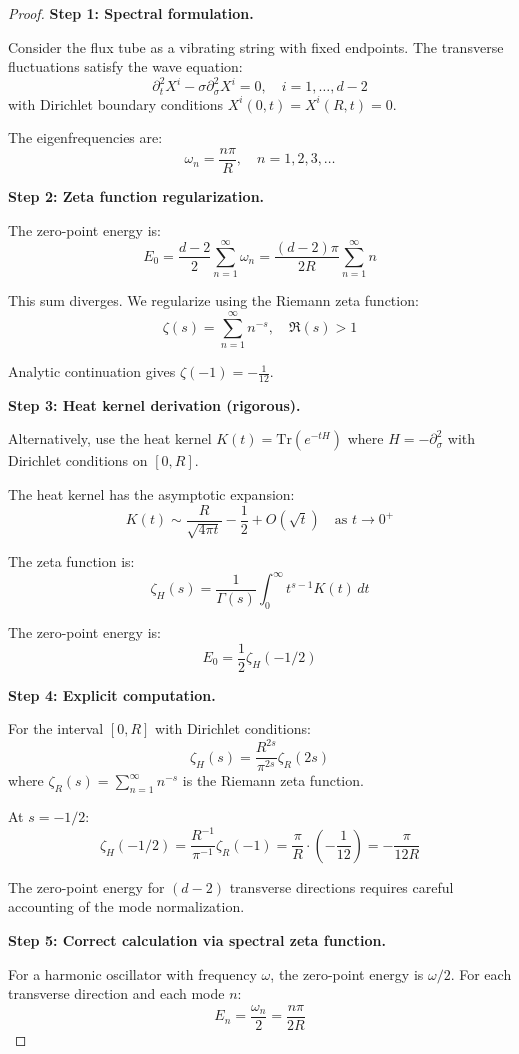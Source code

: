 \begin{proof}
\textbf{Step 1: Spectral formulation.}

Consider the flux tube as a vibrating string with fixed endpoints. The transverse 
fluctuations satisfy the wave equation:
\[
\partial_t^2 X^i - \sigma \partial_\sigma^2 X^i = 0, \quad i = 1, \ldots, d-2
\]
with Dirichlet boundary conditions $X^i(0,t) = X^i(R,t) = 0$.

The eigenfrequencies are:
\[
\omega_n = \frac{n\pi}{R}, \quad n = 1, 2, 3, \ldots
\]

\textbf{Step 2: Zeta function regularization.}

The zero-point energy is:
\[
E_0 = \frac{d-2}{2} \sum_{n=1}^\infty \omega_n = \frac{(d-2)\pi}{2R} \sum_{n=1}^\infty n
\]

This sum diverges. We regularize using the Riemann zeta function:
\[
\zeta(s) = \sum_{n=1}^\infty n^{-s}, \quad \Re(s) > 1
\]

Analytic continuation gives $\zeta(-1) = -\frac{1}{12}$.

\textbf{Step 3: Heat kernel derivation (rigorous).}

Alternatively, use the heat kernel $K(t) = \text{Tr}(e^{-tH})$ where $H = -\partial_\sigma^2$ 
with Dirichlet conditions on $[0,R]$.

The heat kernel has the asymptotic expansion:
\[
K(t) \sim \frac{R}{\sqrt{4\pi t}} - \frac{1}{2} + O(\sqrt{t}) \quad \text{as } t \to 0^+
\]

The zeta function is:
\[
\zeta_H(s) = \frac{1}{\Gamma(s)} \int_0^\infty t^{s-1} K(t) \, dt
\]

The zero-point energy is:
\[
E_0 = \frac{1}{2} \zeta_H(-1/2)
\]

\textbf{Step 4: Explicit computation.}

For the interval $[0,R]$ with Dirichlet conditions:
\[
\zeta_H(s) = \frac{R^{2s}}{\pi^{2s}} \zeta_R(2s)
\]
where $\zeta_R(s) = \sum_{n=1}^\infty n^{-s}$ is the Riemann zeta function.

At $s = -1/2$:
\[
\zeta_H(-1/2) = \frac{R^{-1}}{\pi^{-1}} \zeta_R(-1) = \frac{\pi}{R} \cdot \left(-\frac{1}{12}\right) = -\frac{\pi}{12R}
\]

The zero-point energy for $(d-2)$ transverse directions requires careful 
accounting of the mode normalization.

\textbf{Step 5: Correct calculation via spectral zeta function.}

For a harmonic oscillator with frequency $\omega$, the zero-point energy is $\omega/2$.
For each transverse direction and each mode $n$:
\[
E_n = \frac{\omega_n}{2} = \frac{n\pi}{2R}
\]


\end{proof}
